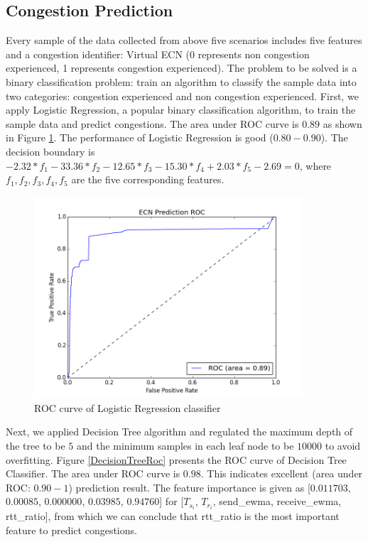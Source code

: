 \subsection{Congestion Prediction}
\label{CongestionPredict}
\par Every sample of the data collected from above five scenarios includes five features and a congestion identifier: Virtual ECN (0 represents non congestion experienced, 1 represents congestion experienced). The problem to be solved is a binary classification problem: train an algorithm to classify the sample data into two categories: congestion experienced and non congestion experienced. First, we apply Logistic Regression, a popular binary classification algorithm, to train the sample data and predict congestions. The area under ROC curve is $0.89$ as shown in Figure \ref{LRRoc}. The performance of Logistic Regression is good ($0.80 - 0.90$). The decision boundary is $ -2.32*f_{1} - 33.36*f_{2} - 12.65*f_{3} - 15.30*f_{4} + 2.03*f_{5} - 2.69 = 0$, where $f_{1}, f_{2}, f_{3}, f_{4}, f_{5}$ are the five corresponding features.
\begin{figure}
\centering
\includegraphics[width=10cm]{LRRoc.png}
\caption{ROC curve of Logistic Regression classifier}
\label{LRRoc}
\end{figure}




\par Next, we applied Decision Tree algorithm and regulated the maximum depth of the tree to be $5$ and the minimum samples in each leaf node to be $10000$ to avoid overfitting. Figure \ref{DecisionTreeRoc} presents the ROC curve of Decision Tree Classifier. The area under ROC curve is $0.98$. This indicates excellent (area under ROC: $0.90 - 1$) prediction result. The feature importance is given as [$0.011703$, $0.00085$, $0.000000$, $0.03985$, $0.94760$] for [$T_{s_{i}}$, $T_{r_{i}}$, send\_ewma, receive\_ewma, rtt\_ratio], from which we can conclude that rtt\_ratio is the most important feature to predict congestions. 

